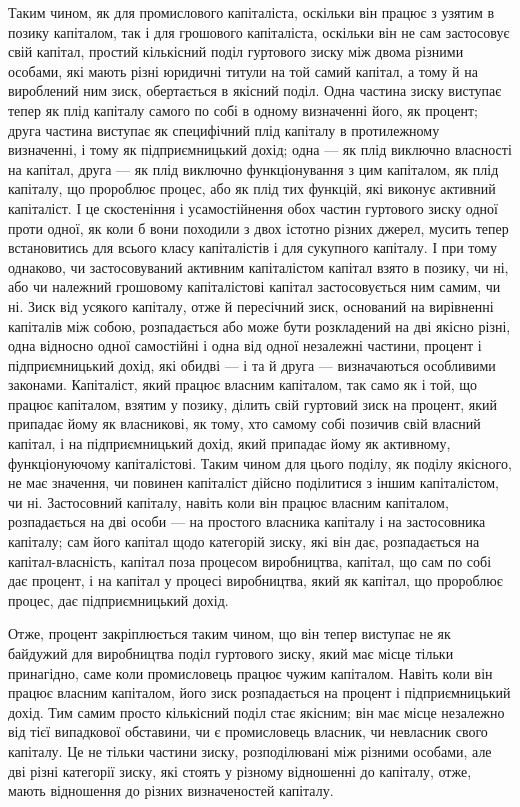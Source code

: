 Таким чином, як для промислового капіталіста, оскільки він
працює з узятим в позику капіталом, так і для грошового капіталіста,
оскільки він не сам застосовує свій капітал, простий
кількісний поділ гуртового зиску між двома різними особами,
які мають різні юридичні титули на той самий капітал, а тому
й на вироблений ним зиск, обертається в якісний поділ. Одна
частина зиску виступає тепер як плід капіталу самого по собі
в одному визначенні його, як процент; друга частина виступає
як специфічний плід капіталу в протилежному визначенні, і
тому як підприємницький дохід; одна — як плід виключно власності
на капітал, друга — як плід виключно функціонування
з цим капіталом, як плід капіталу, що пророблює процес,
або як плід тих функцій, які виконує активний капіталіст. І це
скостеніння і усамостійнення обох частин гуртового зиску одної
проти одної, як коли б вони походили з двох істотно різних
джерел, мусить тепер встановитись для всього класу капіталістів
і для сукупного капіталу. І при тому однаково, чи застосовуваний
активним капіталістом капітал взято в позику, чи ні, або
чи належний грошовому капіталістові капітал застосовується
ним самим, чи ні. Зиск від усякого капіталу, отже й пересічний
зиск, оснований на вирівненні капіталів між собою, розпадається
або може бути розкладений на дві якісно різні, одна відносно
одної самостійні і одна від одної незалежні частини, процент
і підприємницький дохід, які обидві — і та й друга — визначаються
особливими законами. Капіталіст, який працює власним
капіталом, так само як і той, що працює капіталом,
взятим у позику, ділить свій гуртовий зиск на процент, який
припадає йому як власникові, як тому, хто самому собі позичив
свій власний капітал, і на підприємницький дохід, який припадає
йому як активному, функціонуючому капіталістові. Таким чином
для цього поділу, як поділу якісного, не має значення, чи повинен
капіталіст дійсно поділитися з іншим капіталістом, чи ні.
Застосовний капіталу, навіть коли він працює власним капіталом,
розпадається на дві особи — на простого власника капіталу
і на застосовника капіталу; сам його капітал щодо категорій
зиску, які він дає, розпадається на капітал-власність, капітал
поза процесом виробництва, капітал, що сам по собі дає процент,
і на капітал у процесі виробництва, який як капітал, що
пророблює процес, дає підприємницький дохід.

Отже, процент закріплюється таким чином, що він тепер виступає
не як байдужий для виробництва поділ гуртового зиску,
який має місце тільки принагідно, саме коли промисловець працює
чужим капіталом. Навіть коли він працює власним капіталом,
його зиск розпадається на процент і підприємницький
дохід. Тим самим просто кількісний поділ стає якісним; він має
місце незалежно від тієї випадкової обставини, чи є промисловець
власник, чи невласник свого капіталу. Це не тільки частини
зиску, розподілювані між різними особами, але дві різні
категорії зиску, які стоять у різному відношенні до капіталу,
отже, мають відношення до різних визначеностей капіталу.
